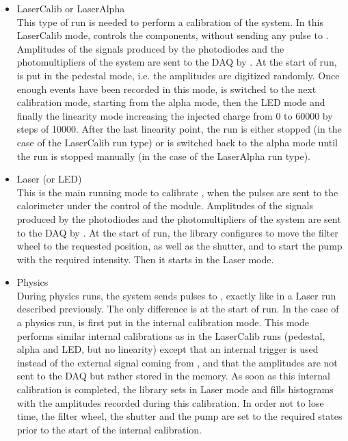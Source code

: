 \begin{itemize}
\item{LaserCalib or LaserAlpha}~\\
This type of run is needed to perform a calibration of the \lasii{} system. In this
LaserCalib mode, \lascar{} controls the \lasii{} components, without sending any
\las{} pulse to \tilecal{}. Amplitudes of the signals produced by the photodiodes
and the photomultipliers of the \lasii{} system are sent to the \atlas{} DAQ by \lascar{}.
At the start of run, \lascar{} is put in the pedestal mode, i.e. the amplitudes
are digitized randomly. Once enough events have been recorded in this mode,
\lascar{} is switched to the next calibration mode, starting from the alpha mode, then the
LED mode and finally the linearity mode increasing the injected charge from 0 to 60000 by steps
of 10000. After the last linearity point, the run is either stopped (in the case of the
LaserCalib run type) or \lascar{} is switched back to the alpha mode until the run is stopped
manually (in the case of the LaserAlpha run type).


\item{Laser (or LED)}~\\
This is the main running mode to calibrate \tilecal{}, when the \las{} pulses are sent to the
calorimeter under the control of the \shaft{} module. Amplitudes of the signals produced by the 
photodiodes and the photomultipliers of the \lasii{} system are sent to the \atlas{} DAQ by 
\lascar{}. At the start of run, the \lasmodule{} library configures \lascar{} to move the filter
wheel to the requested position, as well as the shutter, and to start the \las{} pump with the 
required intensity. Then it starts \lascar{} in the Laser mode.

\item{Physics}~\\
During physics runs, the \lasii{} system sends \las{} pulses to \tilecal{}, exactly like in
a Laser run described previously. The only difference is at the start of run. In the case of
a physics run, \lascar{} is first put in the internal calibration mode. This mode performs
similar internal calibrations as in the LaserCalib runs (pedestal, alpha and LED, but no
linearity) except that an internal trigger is used instead of the external signal coming from
\shaft{}, and that the amplitudes are not sent to the \atlas{} DAQ but rather stored in the 
\lascar{} memory. As soon as this internal calibration is completed, the \lasmodule{} library
sets \lascar{} in Laser mode and fills histograms with the amplitudes recorded during this
calibration. In order not to lose time, the filter wheel, the shutter and the \las{} pump
are set to the required states prior to the start of the internal calibration.


\end{itemize}

